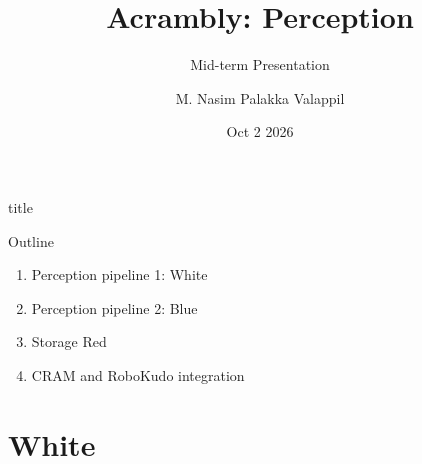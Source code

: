 \documentclass[aspectratio=169,11pt]{beamer}
\title{Acrambly: Perception}
\subtitle{Mid-term Presentation}
\author{M. Nasim Palakka Valappil}
\date{Oct 2 2026}
\begin{document}
\begin{frame}[plain]
  \centering
  \vfill
  \begin{beamercolorbox}{title}
    \parbox[c][1.5cm][c]{\textwidth}{\centering{}\inserttitle}
  \end{beamercolorbox}
  \vspace{0.45cm}
  {\insertsubtitle\par}
  \vspace{0.45cm}
  {\insertauthor\par}
  \vspace{0.45cm}
  {\insertdate\par}
  \vfill
\end{frame}

\begin{frame}{Outline}
  \vspace{0.45cm}
  {\Large\color{uniblue}
    \begin{enumerate}
      \item \textcolor{uniblue}{Perception pipeline 1: White}\vspace{0.42cm}
      \item \textcolor{uniblue}{Perception pipeline 2: Blue}\vspace{0.42cm}
      \item \textcolor{uniblue}{Storage Red}\vspace{0.42cm}
      \item \textcolor{uniblue}{CRAM and RoboKudo integration}
    \end{enumerate}
  }
\end{frame}

\section{White}
\end{document}
